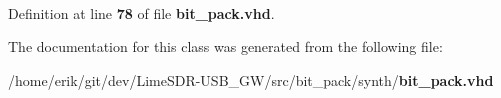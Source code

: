 \paragraph[{pack\+\_\+56\+\_\+to\+\_\+64}]{ {\bfseries \textcolor{vhdlchar}{ }} \hspace{0.3cm}{\ttfamily [Component]}}\label{classbit__pack_1_1arch_a3535a5cc921ac22da73176b10cbd5d9f}


Definition at line {\bf 78} of file {\bf bit\+\_\+pack.\+vhd}.



The documentation for this class was generated from the following file\+:\begin{DoxyCompactItemize}
\item 
/home/erik/git/dev/\+Lime\+S\+D\+R-\/\+U\+S\+B\+\_\+\+G\+W/src/bit\+\_\+pack/synth/{\bf bit\+\_\+pack.\+vhd}\end{DoxyCompactItemize}
